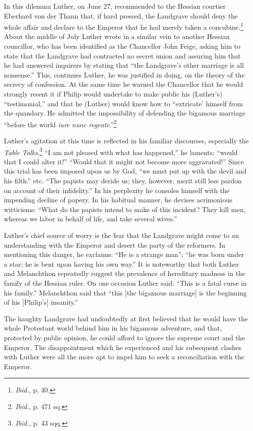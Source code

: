 In this dilemma Luther, on June 27, recommended to the Hessian
courtier Eberhard von der Thann that, if hard pressed, the Landgrave
should deny the whole affair and declare to the Emperor that he had
merely taken a concubine.\footnote{\textit{Ibid.}, p. 40.}
 About the middle of July Luther wrote
in a similar vein to another Hessian councillor, who has been identified
as the Chancellor John Feige, asking him to state that the Landgrave had
contracted no secret union and assuring him that he had
answered inquirers by stating that “the Landgrave’s other marriage is
all nonsense.” This, continues Luther, he was justified in doing, on
the theory of the secrecy of confession. At the same time he warned
the Chancellor that he would strongly resent it if Philip would undertake
to make public his (Luther’s) “testimonial,” and that he (Luther) would
know how to “extricate’ himself from the quandary. He
admitted the impossibility of defending the bigamous marriage “before
the world \textit{iure nunc regente}.”\footnote{\textit{Ibid.}, p. 471 sq.}


Luther’s agitation at this time is reflected in his familiar discourses,
especially the \textit{Table Talks}.\footnote{\textit{Ibid.}, p. 43 sqq.}
“I am not pleased with what has happened,” he
laments; “would that I could alter it!” “Would that it might not become
more aggravated!” Since this trial has been imposed upon us by God, “we
must put up with the devil and his filth.” etc. “The papists may deride us;
they, however, merit still less pardon on account of their infidelity.” In his
perplexity he consoles himself with the impending decline of popery. In his
habitual manner, he devises acrimonious witticisms: “What do the papists
intend to make of this incident? They kill men, whereas we labor in behalf
of life, and take several wives.”

Luther’s chief source of worry is the fear that the Landgrave might come
to an understanding with the Emperor and desert the party of the reformers.
In mentioning this danger, he exclaims: “He is a strange man”; “he was born
under a star; he is bent upon having his own way.” It is noteworthy that
both Luther and Melanchthon repeatedly suggest the prevalence of hereditary
madness in the family of the Hessian ruler. On one occasion Luther
said: “This is a fatal curse in his family.” Melanchthon said that “this [the
bigamous marriage] is the beginning of his [Philip’s] insanity.”

The haughty Landgrave had undoubtedly at first believed that he would
have the whole Protestant world behind him in his bigamous adventure, and
that, protected by public opinion, he could afford to ignore the supreme
court and the Emperor. The disappointment which he experienced and his
subsequent clashes with Luther were all the more apt to impel him to seek
a reconciliation with the Emperor.

